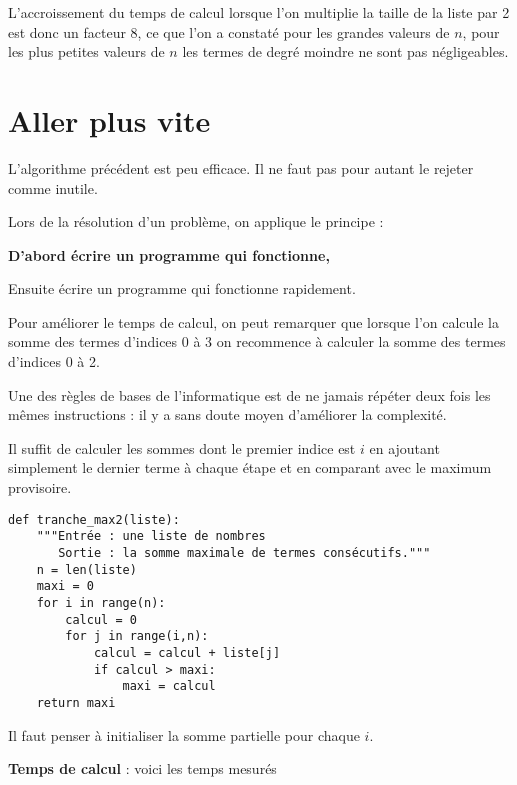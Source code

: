 L'accroissement du temps de calcul lorsque l'on multiplie la taille de la liste par 2 est donc un facteur 8, ce que l'on a constaté pour les grandes valeurs de $n$, pour les plus petites valeurs de $n$ les termes de degré moindre ne sont pas négligeables.

\section{Aller plus vite}
L'algorithme précédent est peu efficace. Il ne faut pas pour autant le rejeter comme inutile.

Lors de la résolution d'un problème, on applique le principe :

\begin{center}\bf
D'abord écrire un programme qui fonctionne,

Ensuite écrire un programme qui fonctionne rapidement.
\end{center}

Pour améliorer le temps de calcul, on peut remarquer que lorsque l'on calcule la somme des termes d'indices 0 à 3 on recommence à calculer la somme des termes d'indices 0 à 2.

Une des règles de bases de l'informatique est de ne jamais répéter deux fois les mêmes instructions : il y a sans doute moyen d'améliorer la complexité.

Il suffit de calculer les sommes dont le premier indice est $i$ en ajoutant simplement le dernier terme à chaque étape et en comparant avec le maximum provisoire.
\begin{lstlisting}
def tranche_max2(liste):
    """Entrée : une liste de nombres
       Sortie : la somme maximale de termes consécutifs."""
    n = len(liste)
    maxi = 0
    for i in range(n):
        calcul = 0
        for j in range(i,n):
            calcul = calcul + liste[j]
            if calcul > maxi: 
                maxi = calcul
    return maxi
\end{lstlisting}

Il faut penser à initialiser la somme partielle pour chaque $i$.

\medskip

{\bf Temps de calcul } : voici les temps mesurés

